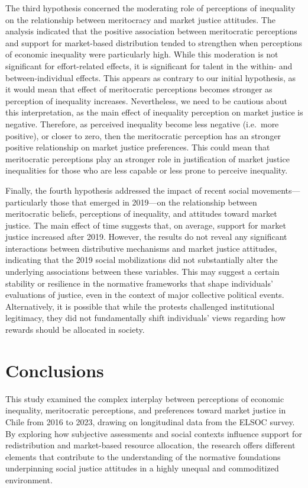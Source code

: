 \documentclass[
  12pt,
]{article}
\begin{document}
The third hypothesis concerned the moderating role of perceptions of
inequality on the relationship between meritocracy and market justice
attitudes. The analysis indicated that the positive association between
meritocratic perceptions and support for market-based distribution
tended to strengthen when perceptions of economic inequality were
particularly high. While this moderation is not significant for
effort-related effects, it is significant for talent in the within- and
between-individual effects. This appears as contrary to our initial
hypothesis, as it would mean that effect of meritocratic perceptions
becomes stronger as perception of inequality increases. Nevertheless, we
need to be cautious about this interpretation, as the main effect of
inequality perception on market justice is negative. Therefore, as
perceived inequality become less negative (i.e.~more positive), or
closer to zero, then the meritocratic perception has an stronger
positive relationship on market justice preferences. This could mean
that meritocratic perceptions play an stronger role in justification of
market justice inequalities for those who are less capable or less prone
to perceive inequality.

Finally, the fourth hypothesis addressed the impact of recent social
movements---particularly those that emerged in 2019---on the
relationship between meritocratic beliefs, perceptions of inequality,
and attitudes toward market justice. The main effect of time suggests
that, on average, support for market justice increased after 2019.
However, the results do not reveal any significant interactions between
distributive mechanisms and market justice attitudes, indicating that
the 2019 social mobilizations did not substantially alter the underlying
associations between these variables. This may suggest a certain
stability or resilience in the normative frameworks that shape
individuals' evaluations of justice, even in the context of major
collective political events. Alternatively, it is possible that while
the protests challenged institutional legitimacy, they did not
fundamentally shift individuals' views regarding how rewards should be
allocated in society.

\section{Conclusions}\label{conclusions}

This study examined the complex interplay between perceptions of
economic inequality, meritocratic perceptions, and preferences toward
market justice in Chile from 2016 to 2023, drawing on longitudinal data
from the ELSOC survey. By exploring how subjective assessments and
social contexts influence support for redistribution and market-based
resource allocation, the research offers different elements that
contribute to the understanding of the normative foundations
underpinning social justice attitudes in a highly unequal and
commoditized environment.
\end{document}
